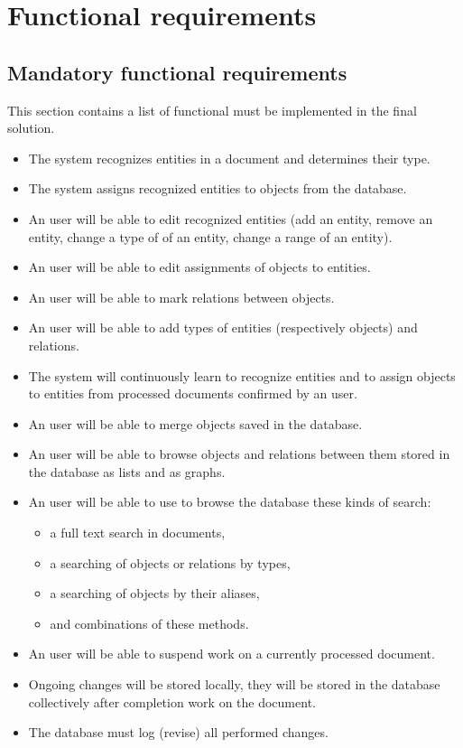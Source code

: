 
\section{Functional requirements}
\subsection{Mandatory functional requirements}
This section contains a list of functional must be implemented in the final solution.

\begin{itemize}
	\item The system recognizes entities in a document and determines their type.
	\item The system assigns recognized entities to objects from the database.
	\item An user will be able to edit recognized entities (add an entity, remove
	an entity, change a type of of an entity, change a range of an entity).
	\item An user will be able to edit assignments of objects to entities.
	\item An user will be able to mark relations between objects.
	\item An user will be able to add types of entities (respectively objects)
	and relations.
	\item The system will continuously learn to recognize entities and to assign
	objects to entities from processed documents confirmed by an user.
	\item An user will be able to merge objects saved in the database.
	\item An user will be able to browse objects and relations between them stored
	in the database as lists and as graphs.
	\item An user will be able to use to browse the database these kinds of search:
	\begin{itemize}
		\item a full text search in documents,
		\item a searching of objects or relations by types,
		\item a searching of objects by their aliases,
		\item and combinations of these methods.
	\end{itemize}
	\item An user will be able to suspend work on a currently processed document.
	\item Ongoing changes will be stored locally, they will be stored in the database
	collectively after completion work on the document.
	\item The database must log (revise) all performed changes.
\end{itemize}

